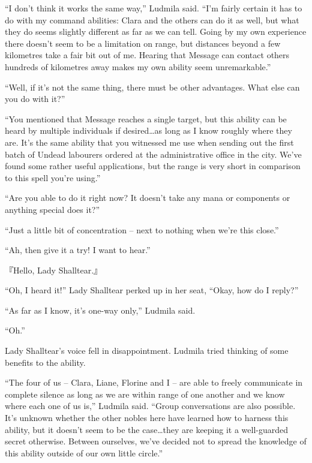 “I don’t think it works the same way,” Ludmila said. “I’m fairly certain it has to do with my command abilities: Clara and the others can do it as well, but what they do seems slightly different as far as we can tell. Going by my own experience there doesn’t seem to be a limitation on range, but distances beyond a few kilometres take a fair bit out of me. Hearing that Message can contact others hundreds of kilometres away makes my own ability seem unremarkable.”

 

“Well, if it’s not the same thing, there must be other advantages. What else can you do with it?”

 

“You mentioned that Message reaches a single target, but this ability can be heard by multiple individuals if desired…as long as I know roughly where they are. It’s the same ability that you witnessed me use when sending out the first batch of Undead labourers ordered at the administrative office in the city. We’ve found some rather useful applications, but the range is very short in comparison to this spell you’re using.”

 

“Are you able to do it right now? It doesn’t take any mana or components or anything special does it?”

 

“Just a little bit of concentration – next to nothing when we’re this close.”

 

“Ah, then give it a try! I want to hear.”

 

『Hello, Lady Shalltear.』

 

“Oh, I heard it!” Lady Shalltear perked up in her seat, “Okay, how do I reply?”

 

“As far as I know, it’s one-way only,” Ludmila said.

 

“Oh.”

 

Lady Shalltear’s voice fell in disappointment. Ludmila tried thinking of some benefits to the ability.

 

“The four of us – Clara, Liane, Florine and I – are able to freely communicate in complete silence as long as we are within range of one another and we know where each one of us is,” Ludmila said. “Group conversations are also possible. It’s unknown whether the other nobles here have learned how to harness this ability, but it doesn’t seem to be the case…they are keeping it a well-guarded secret otherwise. Between ourselves, we’ve decided not to spread the knowledge of this ability outside of our own little circle.”

